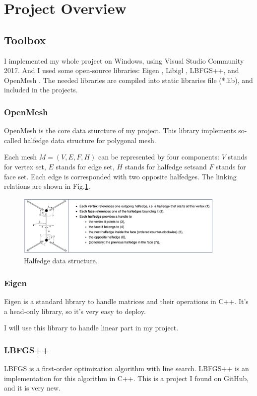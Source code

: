 \section{Project Overview}
\subsection{Toolbox}
I implemented my whole project on Windows, using Visual Studio Community 2017. And I used some open-source libraries: Eigen \cite{eigenweb}, Libigl \cite{libigl}, LBFGS++\cite{LBFGSpp}, and OpenMesh \cite{Botsch02openmesh}. The needed libraries are compiled into static libraries file (*.lib), and included in the projects.

\subsubsection{OpenMesh}
OpenMesh \cite{Botsch02openmesh} is the core data sturcture of my project. This library implements so-called halfedge data structure for polygonal mesh.

Each mesh $M = (V, E, F, H)$ can be represented by four components: $V$ stands for vertex set, $E$ stands for edge set, $H$ stands for halfedge setsand $F$ stands for face set. Each edge is corresponded with two opposite halfedges. The linking relations are shown in Fig.\ref{fig:halfedge}.

\begin{figure}
\includegraphics[width=0.9\textwidth]{images/halfedge}
\caption{Halfedge data structure.}
\label{fig:halfedge}
\end{figure}

\subsubsection{Eigen}
Eigen \cite{eigenweb} is a standard library to handle matrices and their operations in C++. It's a head-only library, so it's very easy to deploy.

I will use this library to handle linear part in my project.

\subsubsection{LBFGS++}
LBFGS is a first-order optimization algorithm with line search. LBFGS++ \cite{LBFGSpp} is an implementation for this algorithm in C++. This is a project I found on GitHub, and it is very new. 

